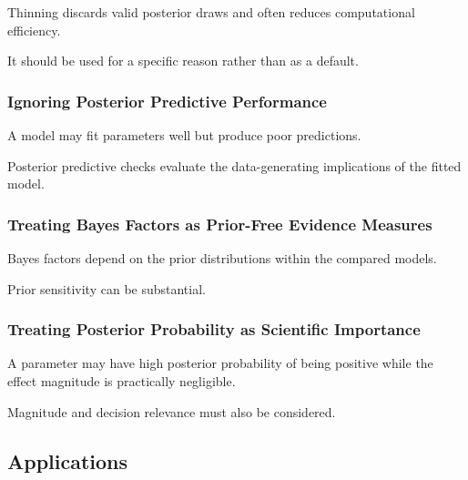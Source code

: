 Thinning discards valid posterior draws and often reduces computational
efficiency.

It should be used for a specific reason rather than as a default.

\subsubsection{Ignoring Posterior Predictive Performance}

A model may fit parameters well but produce poor predictions.

Posterior predictive checks evaluate the data-generating implications of
the fitted model.

\subsubsection{Treating Bayes Factors as Prior-Free Evidence Measures}

Bayes factors depend on the prior distributions within the compared
models.

Prior sensitivity can be substantial.

\subsubsection{Treating Posterior Probability as Scientific Importance}

A parameter may have high posterior probability of being positive while
the effect magnitude is practically negligible.

Magnitude and decision relevance must also be considered.

\subsection{Applications}
\label{subsec:bayesian-applications}

